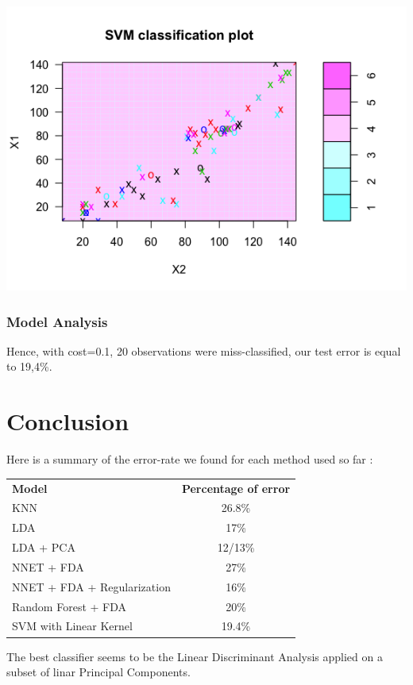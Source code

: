 \documentclass[]{report}
\begin{document}
\begin{center}
	\includegraphics[width=0.8\linewidth]{Figures/svm_test_plot.png}
	\label{SVM on test set}
\end{center}
\subsubsection{Model Analysis}
Hence, with cost=0.1, 20 observations were miss-classified, our test error is equal to 19,4\%.


\pagebreak
\section{Conclusion}
Here is a summary of the error-rate we found for each method used so far : 
\begin{center}
\begin{tabular}{l c}
\textbf{Model} & \textbf{Percentage of error} \\
KNN & 26.8\% \\
LDA & 17\% \\
LDA + PCA & 12/13\% \\
NNET + FDA & 27\% \\
NNET + FDA + Regularization & 16\% \\
Random Forest + FDA & 20\% \\
SVM with Linear Kernel & 19.4\%
\end{tabular}
\end{center}

The best classifier seems to be the Linear Discriminant Analysis applied on a subset of linar Principal Components.
\end{document}
